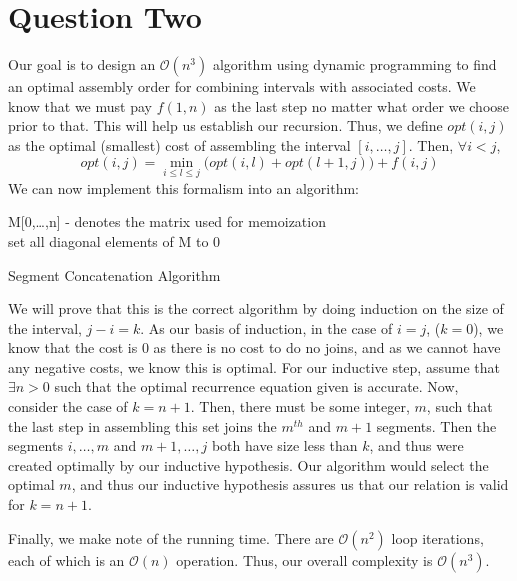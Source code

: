 \documentclass[11pt,letterpaper]{article}
\begin{document}
\section*{Question Two}
Our goal is to design an $\mathcal{O}(n^3)$ algorithm using dynamic programming to find an optimal assembly order for combining intervals with associated costs. We know that we must pay $f(1,n)$ as the last step no matter what order we choose prior to that. This will help us establish our recursion. Thus, we define $opt(i,j)$ as the optimal (smallest) cost of assembling the interval $[i,\ldots,j]$. Then, $\forall i < j$, 
\begin{equation*}
	opt(i,j) = \min_{i\leq l \leq j}\Big( opt(i,l) + opt(l+1, j) \Big) + f(i,j)
\end{equation*}
We can now implement this formalism into an algorithm:

\vspace{5mm}
\begin{algorithm}[H]
	M[0,\ldots,n] - denotes the matrix used for memoization \\
	set all diagonal elements of M to 0\;
\caption{Segment Concatenation Algorithm}	
\end{algorithm}
\vspace{5mm}


We will prove that this is the correct algorithm by doing induction on the size of the interval, $j-i = k$. As our basis of induction, in the case of $i=j$, ($k=0$), we know that the cost is 0 as there is no cost to do no joins, and as we cannot have any negative costs, we know this is optimal. For our inductive step, assume that $\exists n > 0$ such that the optimal recurrence equation given is accurate. Now, consider the case of $k = n+1$. Then, there must be some integer, $m$, such that the last step in assembling this set joins the $m^{th}$ and $m+1$ segments. Then the segments $i,\ldots,m$ and $m+1,\ldots,j$ both have size less than $k$, and thus were created optimally by our inductive hypothesis. Our algorithm would select the optimal $m$, and thus our inductive hypothesis assures us that our relation is valid for $k = n+1$. 

Finally, we make note of the running time. There are $\mathcal{O}(n^2)$ loop iterations, each of which is an $\mathcal{O}(n)$ operation. Thus, our overall complexity is $\mathcal{O}(n^3)$.
\end{document}
